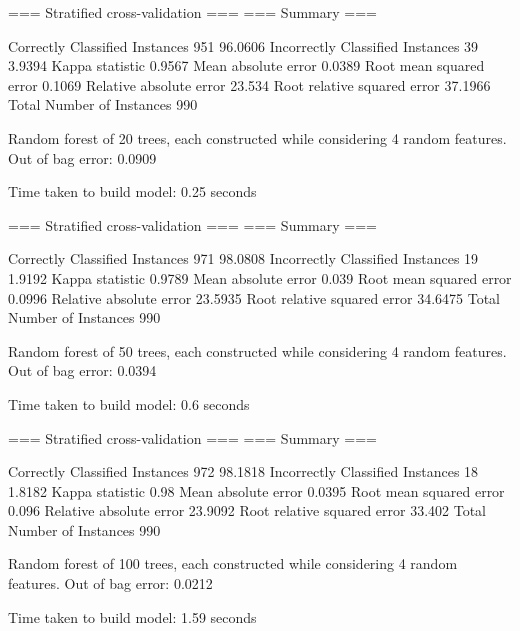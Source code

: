 === Stratified cross-validation ===
=== Summary ===

Correctly Classified Instances         951               96.0606 %
Incorrectly Classified Instances        39                3.9394 %
Kappa statistic                          0.9567
Mean absolute error                      0.0389
Root mean squared error                  0.1069
Relative absolute error                 23.534  %
Root relative squared error             37.1966 %
Total Number of Instances              990



Random forest of 20 trees, each constructed while considering 4 random features.
Out of bag error: 0.0909



Time taken to build model: 0.25 seconds

=== Stratified cross-validation ===
=== Summary ===

Correctly Classified Instances         971               98.0808 %
Incorrectly Classified Instances        19                1.9192 %
Kappa statistic                          0.9789
Mean absolute error                      0.039 
Root mean squared error                  0.0996
Relative absolute error                 23.5935 %
Root relative squared error             34.6475 %
Total Number of Instances              990     



Random forest of 50 trees, each constructed while considering 4 random features.
Out of bag error: 0.0394



Time taken to build model: 0.6 seconds

=== Stratified cross-validation ===
=== Summary ===

Correctly Classified Instances         972               98.1818 %
Incorrectly Classified Instances        18                1.8182 %
Kappa statistic                          0.98  
Mean absolute error                      0.0395
Root mean squared error                  0.096 
Relative absolute error                 23.9092 %
Root relative squared error             33.402  %
Total Number of Instances              990



Random forest of 100 trees, each constructed while considering 4 random features.
Out of bag error: 0.0212



Time taken to build model: 1.59 seconds

